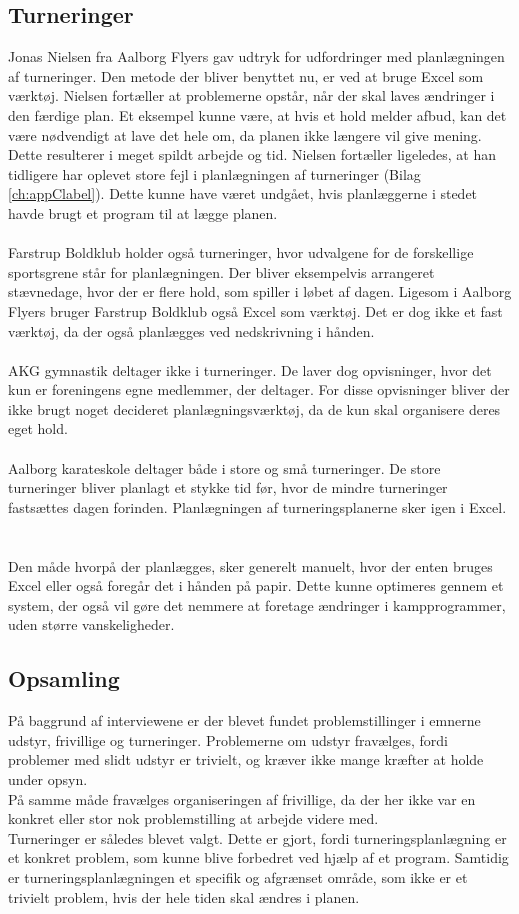\subsection*{Turneringer}
Jonas Nielsen fra Aalborg Flyers gav udtryk for udfordringer med planlægningen af turneringer. Den metode der bliver benyttet nu, er ved at bruge Excel som værktøj. Nielsen fortæller at problemerne opstår, når der skal laves ændringer i den færdige plan. Et eksempel kunne være, at hvis et hold melder afbud, kan det være nødvendigt at lave det hele om, da planen ikke længere vil give mening. Dette resulterer i meget spildt arbejde og tid. Nielsen fortæller ligeledes, at han tidligere har oplevet store fejl i planlægningen af turneringer (Bilag \ref{ch:appClabel}). Dette kunne have været undgået, hvis planlæggerne i stedet havde brugt et program til at lægge planen.
\\\\
Farstrup Boldklub holder også turneringer, hvor udvalgene for de forskellige sportsgrene står for planlægningen. Der bliver eksempelvis arrangeret stævnedage, hvor der er flere hold, som spiller i løbet af dagen. Ligesom i Aalborg Flyers bruger Farstrup Boldklub også Excel som værktøj. Det er dog ikke et fast værktøj, da der også planlægges ved nedskrivning i hånden.
\\\\
AKG gymnastik deltager ikke i turneringer. De laver dog opvisninger, hvor det kun er foreningens egne medlemmer, der deltager. For disse opvisninger bliver der ikke brugt noget decideret planlægningsværktøj, da de kun skal organisere deres eget hold. %
\\\\
Aalborg karateskole deltager både i store og små turneringer. De store turneringer bliver planlagt et stykke tid før, hvor de mindre turneringer fastsættes dagen forinden. Planlægningen af turneringsplanerne sker igen i Excel. 
\\\\\\
Den måde hvorpå der planlægges, sker generelt manuelt, hvor der enten bruges Excel eller også foregår det i hånden på papir. Dette kunne optimeres gennem et system, der også vil gøre det nemmere at foretage ændringer i kampprogrammer, uden større vanskeligheder.

\subsection*{Opsamling}
På baggrund af interviewene er der blevet fundet problemstillinger i emnerne udstyr, frivillige og turneringer. Problemerne om udstyr fravælges, fordi problemer med slidt udstyr er trivielt, og kræver ikke mange kræfter at holde under opsyn. \\
På samme måde fravælges organiseringen af frivillige, da der her ikke var en konkret eller stor nok problemstilling at arbejde videre med.\\
Turneringer er således blevet valgt. Dette er gjort, fordi turneringsplanlægning er et konkret problem, som kunne blive forbedret ved hjælp af et program. Samtidig er turneringsplanlægningen et specifik og afgrænset område, som ikke er et trivielt problem, hvis der hele tiden skal ændres i planen.

